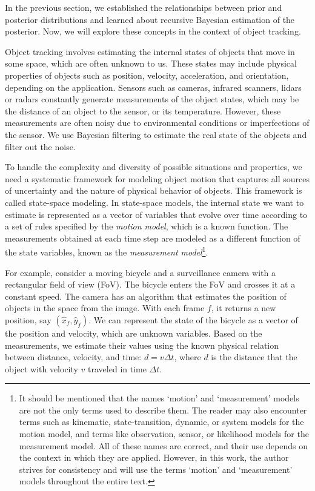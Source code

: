 
In the previous section, we established the relationships between prior and 
posterior distributions and learned about recursive Bayesian estimation of the 
posterior. Now, we will explore these concepts in the context of object 
tracking.

Object tracking involves estimating the internal states of objects that move in 
some space, which are often unknown to us. These states may include physical 
properties of objects such as position, velocity, acceleration, and 
orientation, depending on the application. Sensors such as cameras, infrared 
scanners, lidars or radars constantly generate measurements of the object 
states, which may be the distance of an object to the sensor, or its 
temperature. However, these measurements are often noisy due to environmental 
conditions or imperfections of the sensor. We use Bayesian filtering to 
estimate the real state of the objects and filter out the noise.

To handle the complexity and diversity of possible situations and properties, 
we need a systematic framework for modeling object motion that captures all 
sources of uncertainty and the nature of physical behavior of objects. This 
framework is called state-space modeling. In state-space models, the internal 
state we want to estimate is represented as a vector of variables that evolve 
over time according to a set of rules specified by the \textit{motion model}, 
which is a known function. The measurements obtained at each time step are 
modeled as a different function of the state variables, known as the 
\textit{measurement model}\footnote{
    It should be mentioned that the names `motion' and `measurement' models are 
    not the only terms used to describe them. The reader may also encounter 
    terms such as kinematic, state-transition, dynamic, or system models for the 
    motion model, and terms like observation, sensor, or likelihood models for 
    the measurement model. All of these names are correct, and their use depends 
    on the context in which they are applied. However, in this work, the author 
    strives for consistency and will use the terms `motion' and `measurement' 
    models throughout the entire text.
}.

For example, consider a moving bicycle and a surveillance camera with a 
rectangular field of view (FoV). The bicycle enters the FoV and crosses it at a 
constant speed. The camera has an algorithm that estimates the position of 
objects in the space from the image. With each frame $f$, it returns a new 
position, say $(\hat x_f, \hat y_f)$. We can represent the state of the bicycle 
as a vector of the position and velocity, which are unknown variables. Based on 
the measurements, we estimate their values using the known physical relation 
between distance, velocity, and time: $d = v \Delta t$, where $d$ is the 
distance that the object with velocity $v$ traveled in time $\Delta t$.

